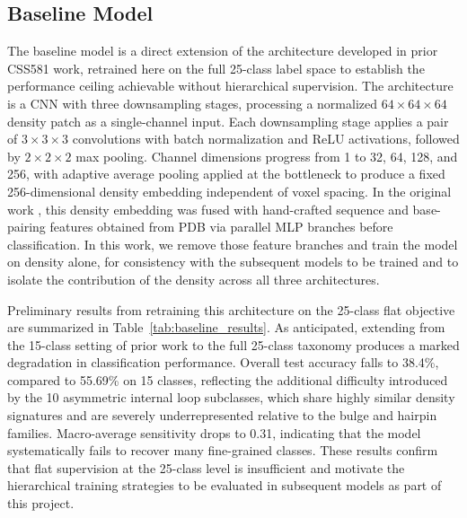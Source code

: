 \documentclass[sigconf]{acmart}
\begin{document}
\subsection{Baseline Model}
\label{sec:baseline}
 
The baseline model is a direct extension of the architecture
developed in prior CSS581 work, retrained here on the
full 25-class label space to establish the performance ceiling
achievable without hierarchical supervision. The architecture
is a CNN with three downsampling stages, processing
a normalized $64 \times 64 \times 64$ density patch as a
single-channel input. Each downsampling stage applies a pair of
$3 \times 3 \times 3$ convolutions with batch normalization and
ReLU activations, followed by $2 \times 2 \times 2$ max pooling.
Channel dimensions progress from 1 to 32, 64, 128, and 256,
with adaptive average pooling applied at the bottleneck to produce
a fixed 256-dimensional density embedding independent of voxel
spacing. In the original work \cite{mbaku2025}, this density
embedding was fused with hand-crafted sequence and base-pairing 
features obtained from PDB via parallel MLP branches before classification. In this
work, we remove those feature branches and train the
model on density alone, for consistency with the subsequent models to be trained and
to isolate the contribution of the density across all
three architectures.
 
Preliminary results from retraining this architecture on the
25-class flat objective are summarized in Table~\ref{tab:baseline_results}.
As anticipated, extending from the 15-class setting of prior work
to the full 25-class taxonomy produces a marked degradation in
classification performance. Overall test accuracy falls to 38.4\%,
compared to 55.69\% on 15 classes, reflecting
the additional difficulty introduced by the 10 asymmetric internal
loop subclasses, which share highly similar density signatures
and are severely underrepresented relative to the bulge and hairpin
families. Macro-average sensitivity drops to 0.31, indicating that
the model systematically fails to recover many fine-grained classes. These results
confirm that flat supervision at the 25-class level is insufficient
and motivate the hierarchical training strategies to be evaluated in
subsequent models as part of this project.
 
\end{document}
